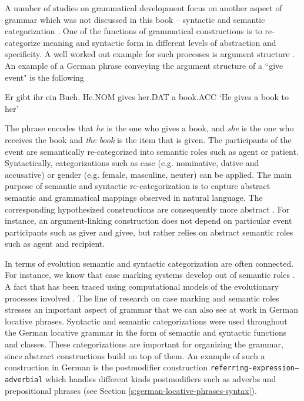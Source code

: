 A number of studies on grammatical development focus on another aspect
of grammar which was not discussed in this book -- syntactic and semantic categorization \citep{steels2011phrasal}.
One of the functions of grammatical constructions is to re-categorize meaning 
and syntactic form in different levels of abstraction and specificity. 
A well worked out example for such processes is argument structure 
\citep{steels2002case,steels2007multi-level,vantrijp2008phd}. 
An example of a German phrase conveying the argument structure of a ``give event"
is the following 
\begin{example}
\gll Er gibt ihr ein Buch.
He.NOM gives her.DAT a book.ACC
\glt `He gives a book to her'
\glend
\end{example}

The phrase encodes that \emph{he} is the one who gives a book, and \emph{she} is 
the one who receives the book and \emph{the book} is the item that is given. 
The participants of the event are semantically re-categorized into semantic roles 
such as agent or patient. Syntactically, categorizations such as case (e.g. 
nominative, dative and accusative) or gender (e.g. female, masculine, neuter)
can be applied. The main purpose of semantic and syntactic re-categorization 
is to capture abstract semantic and grammatical mappings observed in 
natural language. The corresponding hypothesized constructions 
are consequently more abstract \citep{steels2011phrasal}. For instance,
an argument-linking construction does not depend on particular event participants
such as giver and givee, but rather relies on abstract semantic roles such
as agent and recipient.

In terms of evolution semantic and syntactic categorization are often connected. 
For instance, we know that case marking systems develop out of 
semantic roles \citep{blake1994case}. A fact that has been traced using computational
models of the evolutionary processes involved \citep{vantrijp2008phd}.
The line of research on case marking and semantic roles 
\citep{steels2002case,vantrijp2008phd} stresses an important
aspect of grammar that we can also see at work in German locative phrases.
Syntactic and semantic categorizations were used throughout the 
German locative grammar in the form of semantic and syntactic functions
and classes. These categorizations are important for organizing the grammar,
since abstract constructions build on top of them. An example of such a construction
in German is the postmodifier construction 
{\footnotesize\tt referring-expression--adverbial} which handles different kinds postmodifiers 
such as adverbs and prepositional phrases (see Section \ref{s:german-locative-phrases-syntax}). 

